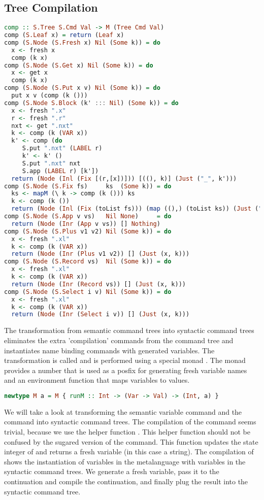 \subsection{\label{subsection:semtosyn}Tree Compilation}
\begin{lstlisting}[language=Haskell]
comp :: S.Tree S.Cmd Val -> M (Tree Cmd Val)
comp (S.Leaf x) = return (Leaf x)
comp (S.Node (S.Fresh x) Nil (Some k)) = do
  x <- fresh x
  comp (k x)
comp (S.Node (S.Get x) Nil (Some k)) = do
  x <- get x
  comp (k x)
comp (S.Node (S.Put x v) Nil (Some k)) = do
  put x v (comp (k ()))
comp (S.Node S.Block (k' ::: Nil) (Some k)) = do
  x <- fresh ".x"
  r <- fresh ".r"
  nxt <- get ".nxt"
  k <- comp (k (VAR x))
  k' <- comp (do
     S.put ".nxt" (LABEL r)
     k' <- k' ()
     S.put ".nxt" nxt
     S.app (LABEL r) [k'])
  return (Node (Inl (Fix [(r,[x])])) [((), k)] (Just ("_", k')))
comp (S.Node (S.Fix fs)     ks  (Some k)) = do
  ks <- mapM (\ k -> comp (k ())) ks
  k <- comp (k ())
  return (Node (Inl (Fix (toList fs))) (map ((),) (toList ks)) (Just ("_", k)))
comp (S.Node (S.App v vs)   Nil None)     = do
  return (Node (Inr (App v vs)) [] Nothing)
comp (S.Node (S.Plus v1 v2) Nil (Some k)) = do
  x <- fresh ".xl"
  k <- comp (k (VAR x))
  return (Node (Inr (Plus v1 v2)) [] (Just (x, k)))
comp (S.Node (S.Record vs)  Nil (Some k)) = do
  x <- fresh ".xl"
  k <- comp (k (VAR x))
  return (Node (Inr (Record vs)) [] (Just (x, k)))
comp (S.Node (S.Select i v) Nil (Some k)) = do
  x <- fresh ".xl"
  k <- comp (k (VAR x))
  return (Node (Inr (Select i v)) [] (Just (x, k)))
\end{lstlisting}

The transformation from semantic command trees into syntactic command trees eliminates the extra 'compilation' commands from the command tree and instantiates name binding commands with generated variables. The transformation is called  and is performed using a special monad . The monad  provides a number that is used as a posfix for generating fresh variable names and an environment function that maps variables to values. 

\begin{lstlisting}[language=Haskell]
newtype M a = M { runM :: Int -> (Var -> Val) -> (Int, a) }
\end{lstlisting}

We will take a look at transforming the semantic  variable command and the  command into syntactic command trees. The compilation of the  command seems trivial, because we use the helper function . This helper function should not be confused by the sugared version of the  command. This function updates the state integer of  and returns a fresh variable (in this case a string). The compilation of  shows the instantiation of variables in the metalanguage with variables in the syntactic command trees. We generate a fresh variable, pass it to the continuation and compile the continuation, and finally plug the result into the syntactic command tree.

